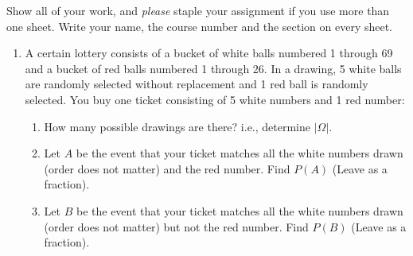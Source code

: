 


\renewcommand{\ansfont}[1]{}



\pagestyle{fancy} 
Show all of your work, and \emph{please} staple your assignment if you use more than one sheet. Write your name, the course number and the section on every sheet. 

\begin{enumerate} 
  \item A certain lottery consists of a bucket of white balls numbered 1 through 69 and a bucket of red balls numbered 1 through 26. In a drawing, 5 white balls are randomly selected without replacement and 1 red ball is randomly selected. You buy one ticket consisting of 5 white numbers and 1 red number:
    \begin{enumerate}
      \item How many possible drawings are there? i.e., determine $|\Omega|$.
			\item Let $A$ be the event that your ticket matches all the white numbers drawn (order does not matter) and the red number. Find $P(A)$ (Leave as a fraction).
			\item Let $B$ be the event that your ticket matches all the white numbers drawn (order does not matter) but not the red number. Find $P(B)$ (Leave as a fraction).
			
    \end{enumerate}
    \ansfont{
		\begin{enumerate}
      \item There are $69\choose5$ ways to drawn 5 balls out of the 69 white balls without replacement. For each of these combinations, there can be 26 red balls to go with it. Using the multiplication principle, there are $69\choose5$ $\cdot$ 26 = 292,201,338 possible drawing combinations.
			\item There is $5\choose5$ = 1 way to match the 5 white numbers and $1\choose1$ = 1 way to match the red number. So, $|A|$ = $1 \cdot 1 = 1$ and $P(A) = \frac{1}{292201338}$
			\item There is $5\choose5$ = 1 way to match the 5 white numbers and $25\choose1$ = 25 ways to match the non-drawn red ball. So, $|B|$ = $1 \cdot 25 = 25$ and $P(B) = \frac{25}{292201338}$
			\end{enumerate}
    }




\end{enumerate}
